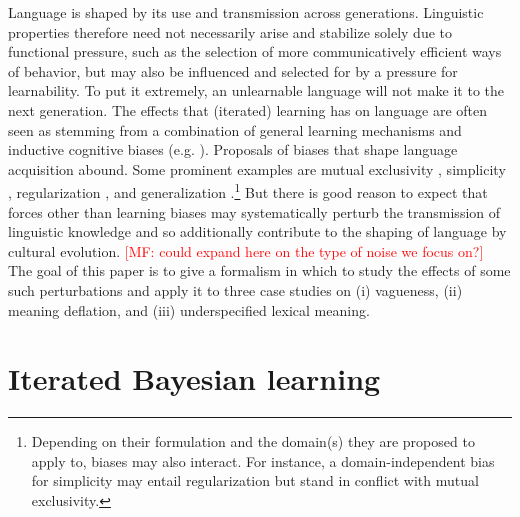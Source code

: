 \documentclass[10pt,a4paper]{article}
\newcommand{\mf}[1]{\textcolor{Red}{[MF: #1]}}
\begin{document}
Language is shaped by its use and transmission across generations. Linguistic properties
therefore need not necessarily arise and stabilize solely due to functional pressure, such as
the selection of more communicatively efficient ways of behavior, but may also be influenced
and selected for by a pressure for learnability. To put it extremely, an unlearnable language
will not make it to the next generation. The effects that (iterated) learning has on language
are often seen as stemming from a combination of general learning mechanisms and inductive
cognitive biases
(e.g. \citealt{griffiths+kalish:2007,kirby+etal:2014,tamariz+kirby:2016}). Proposals of biases
that shape language acquisition abound. Some prominent examples are mutual exclusivity
\citep{merriman+bowman:1989,clark:2009}, simplicity \citep{kirby+etal:2015}, regularization
\citep{hudson+etal:2005}, and generalization
\citep{smith:2011,oconnor:2015}.\footnote{Depending on their formulation and the domain(s) they
  are proposed to apply to, biases may also interact. For instance, a domain-independent bias
  for simplicity may entail regularization but stand in conflict with mutual exclusivity.} But
there is good reason to expect that forces other than learning biases may systematically
perturb the transmission of linguistic knowledge and so additionally contribute to the shaping
of language by cultural evolution. \mf{could expand here on the type of noise we focus on?} The
goal of this paper is to give a formalism in which to study the effects of some such
perturbations and apply it to three case studies on (i) vagueness, (ii) meaning deflation, and
(iii) underspecified lexical meaning.

\section{Iterated Bayesian learning}
\end{document}
